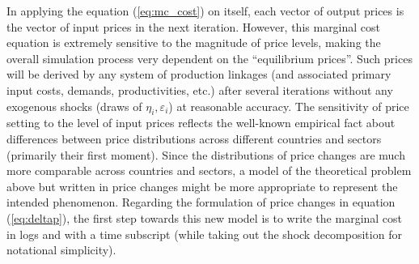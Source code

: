 In applying the equation (\ref{eq:mc_cost}) on itself, each vector of output prices is the vector of input prices in the next 
iteration. However, this marginal cost equation is extremely sensitive to the magnitude of price levels, making the overall simulation 
process very dependent on the ``equilibrium prices''. Such prices will be derived by any system of production linkages (and associated 
primary input costs, demands, productivities, etc.) after several iterations without any exogenous shocks (draws of 
$\eta_i, \varepsilon_i$) at reasonable accuracy. The sensitivity of price setting to the level of input prices reflects the well-known 
empirical fact about differences between price distributions across different countries and sectors (primarily their first moment). 
Since the distributions of price changes are much more comparable across countries and sectors, a model of the theoretical problem 
above but written in price changes might be more appropriate to represent the intended phenomenon. Regarding the formulation of price 
changes in equation (\ref{eq:deltap}), the first step towards this new model is to write the marginal cost in logs and with a time 
subscript (while taking out the shock decomposition for notational simplicity).

